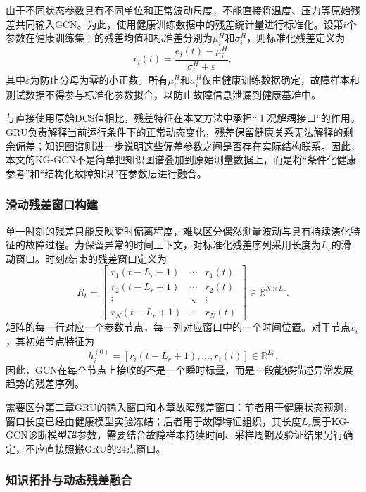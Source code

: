 由于不同状态参数具有不同单位和正常波动尺度，不能直接将温度、压力等原始残差共同输入GCN。为此，使用健康训练数据中的残差统计量进行标准化。设第$i$个参数在健康训练集上的残差均值和标准差分别为$\mu_i^{H}$和$\sigma_i^{H}$，则标准化残差定义为
\begin{equation}
    r_i(t)=\frac{e_i(t)-\mu_i^{H}}{\sigma_i^{H}+\varepsilon},
\end{equation}
其中$\varepsilon$为防止分母为零的小正数。所有$\mu_i^{H}$和$\sigma_i^{H}$仅由健康训练数据确定，故障样本和测试数据不得参与标准化参数拟合，以防止故障信息泄漏到健康基准中。

与直接使用原始DCS值相比，残差特征在本文方法中承担“工况解耦接口”的作用。GRU负责解释当前运行条件下的正常动态变化，残差保留健康关系无法解释的剩余偏差；知识图谱则进一步说明这些偏差参数之间是否存在实际结构联系。因此，本文的KG-GCN不是简单把知识图谱叠加到原始测量数据上，而是将“条件化健康参考”和“结构化故障知识”在参数层进行融合。

\subsubsection{滑动残差窗口构建}

单一时刻的残差只能反映瞬时偏离程度，难以区分偶然测量波动与具有持续演化特征的故障过程。为保留异常的时间上下文，对标准化残差序列采用长度为$L_r$的滑动窗口。时刻$t$结束的残差窗口定义为
\begin{equation}
R_t=
\begin{bmatrix}
 r_1(t-L_r+1) & \cdots & r_1(t)\\
 r_2(t-L_r+1) & \cdots & r_2(t)\\
 \vdots & \ddots & \vdots\\
 r_N(t-L_r+1) & \cdots & r_N(t)
\end{bmatrix}
\in\mathbb R^{N\times L_r}.
\end{equation}
矩阵的每一行对应一个参数节点，每一列对应窗口中的一个时间位置。对于节点$v_i$，其初始节点特征为
\begin{equation}
    h_i^{(0)}=[r_i(t-L_r+1),\ldots,r_i(t)]\in\mathbb R^{L_r}.
\end{equation}
因此，GCN在每个节点上接收的不是一个瞬时标量，而是一段能够描述异常发展趋势的残差序列。

需要区分第二章GRU的输入窗口和本章故障残差窗口：前者用于健康状态预测，窗口长度已经由健康模型实验冻结；后者用于故障特征组织，其长度$L_r$属于KG-GCN诊断模型超参数，需要结合故障样本持续时间、采样周期及验证结果另行确定，不应直接照搬GRU的24点窗口。

\subsubsection{知识拓扑与动态残差融合}

